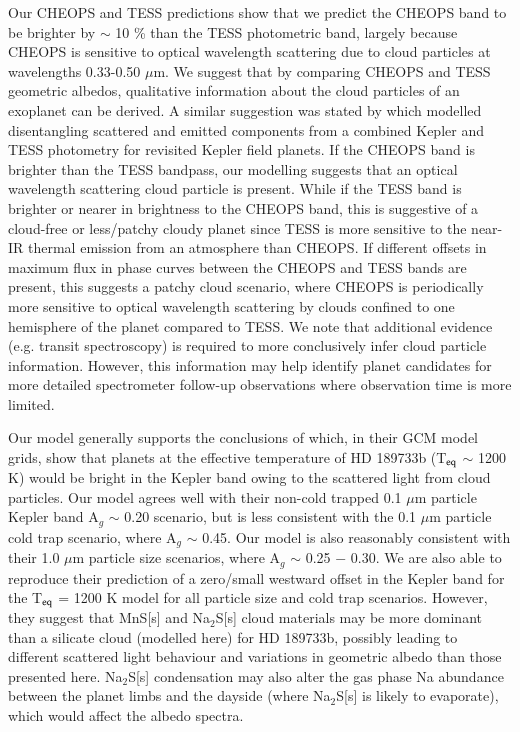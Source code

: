 \documentclass{aa}
\begin{document}
Our CHEOPS and TESS predictions show that we predict the CHEOPS band to be brighter by $\sim$ 10 \% than the TESS photometric band, largely because CHEOPS is sensitive to optical wavelength scattering due to cloud particles at wavelengths 0.33-0.50 $\mu$m. 
We suggest that by comparing CHEOPS and TESS geometric albedos, qualitative information about the cloud particles of an exoplanet can be derived.
A similar suggestion was stated by \citet{Placek2016} which modelled disentangling scattered and emitted components from a combined Kepler and TESS photometry for revisited Kepler field planets.
If the CHEOPS band is brighter than the TESS bandpass, our modelling suggests that an optical wavelength scattering cloud particle is present.
While if the TESS band is brighter or nearer in brightness to the CHEOPS band, this is suggestive of a cloud-free or less/patchy cloudy planet since TESS is more sensitive to the near-IR thermal emission from an atmosphere than CHEOPS.
If different offsets in maximum flux in phase curves between the CHEOPS and TESS bands are present, this suggests a patchy cloud scenario, where CHEOPS is periodically more sensitive to optical wavelength scattering by clouds confined to one hemisphere of the planet compared to TESS.
We note that additional evidence (e.g. transit spectroscopy) is required to more conclusively infer cloud particle information.
However, this information may help identify planet candidates for more detailed spectrometer follow-up observations where observation time is more limited.

Our model generally supports the conclusions of \citet{Parmentier2016} which, in their GCM model grids, show that planets at the effective temperature of HD 189733b (T$_{\rm eq}$ $\sim$ 1200 K) would be bright in the Kepler band owing to the scattered light from cloud particles.
Our model agrees well with their non-cold trapped 0.1 $\mu$m particle Kepler band A$_{g}$ $\sim$ 0.20 scenario, but is less consistent with the 0.1 $\mu$m particle cold trap scenario, where A$_{g}$ $\sim$ 0.45. 
Our model is also reasonably consistent with their 1.0 $\mu$m particle size scenarios, where A$_{g}$ $\sim$ 0.25 $-$ 0.30.
We are also able to reproduce their prediction of a zero/small westward offset in the Kepler band for the T$_{\rm eq}$ = 1200 K model for all particle size and cold trap scenarios.
However, they suggest that MnS[s] and Na$_{2}$S[s] cloud materials may be more dominant than a silicate cloud (modelled here) for HD 189733b, possibly leading to different scattered light behaviour and variations in geometric albedo than those presented here.
Na$_{2}$S[s] condensation may also alter the gas phase Na abundance between the planet limbs and the dayside (where Na$_{2}$S[s] is likely to evaporate), which would affect the albedo spectra.
\end{document}
